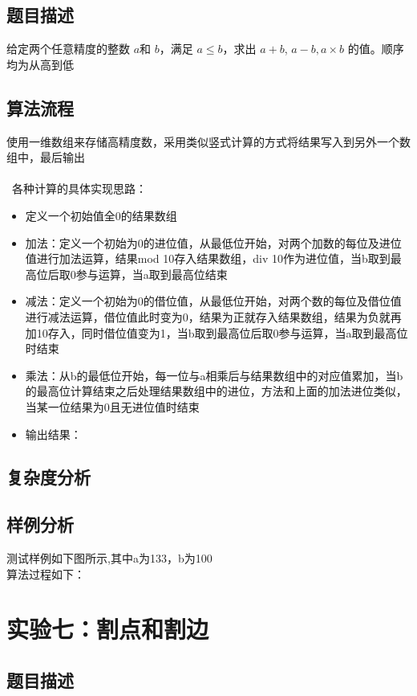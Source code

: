 \documentclass[UTF8,a4paperdui, %
]{ctexart}
\begin{document}
\subsection{题目描述}
给定两个任意精度的整数 $a $和 $b$，满足 $a \leq b$，求出 $a+b$, $a−b, a×b$ 的值。顺序均为从高到低
\subsection{算法流程}
使用一维数组来存储高精度数，采用类似竖式计算的方式将结果写入到另外一个数组中，最后输出\\
\\\
各种计算的具体实现思路：
\begin{itemize}
    \item 定义一个初始值全0的结果数组
    \item 加法：定义一个初始为0的进位值，从最低位开始，对两个加数的每位及进位值进行加法运算，结果mod 10存入结果数组，div 10作为进位值，当b取到最高位后取0参与运算，当a取到最高位结束
    \item 减法：定义一个初始为0的借位值，从最低位开始，对两个数的每位及借位值进行减法运算，借位值此时变为0，结果为正就存入结果数组，结果为负就再加10存入，同时借位值变为1，当b取到最高位后取0参与运算，当a取到最高位时结束
    \item 乘法：从b的最低位开始，每一位与a相乘后与结果数组中的对应值累加，当b的最高位计算结束之后处理结果数组中的进位，方法和上面的加法进位类似，当某一位结果为0且无进位值时结束
    \item 输出结果：
\end{itemize}
\subsection{复杂度分析}

\subsection{样例分析}
测试样例如下图所示,其中a为133，b为100
\\
算法过程如下：

\newpage
\section{实验七：割点和割边}

\subsection{题目描述}
\end{document}
